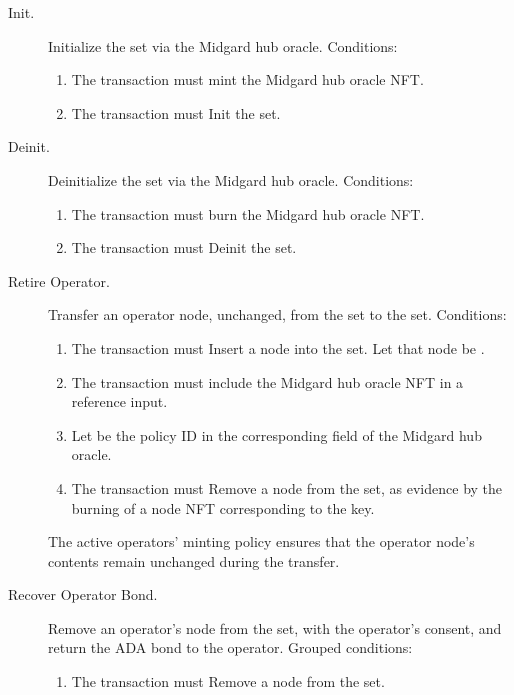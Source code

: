 \documentclass[../midgard.tex]{subfiles}
\begin{document}
\begin{description}
    \item[Init.] Initialize the  set via the Midgard hub oracle.
      Conditions:
        \begin{enumerate}
            \item The transaction must mint the Midgard hub oracle NFT.
            \item The transaction must Init the  set.
        \end{enumerate}
    \item[Deinit.] Deinitialize the  set via the Midgard hub oracle.
      Conditions:
        \begin{enumerate}
            \item The transaction must burn the Midgard hub oracle NFT.
            \item The transaction must Deinit the  set.
        \end{enumerate}
    \item[Retire Operator.] Transfer an operator node, unchanged, from the  set to the  set.
      Conditions:
        \begin{enumerate}
            \item The transaction must Insert a node into the  set.
              Let that node be .
            \item The transaction must include the Midgard hub oracle NFT in a reference input.
            \item Let  be the policy ID in the corresponding field of the Midgard hub oracle.
            \item The transaction must Remove a node from the  set, as evidence by the burning of a  node NFT corresponding to the  key.
        \end{enumerate}
        The active operators' minting policy ensures that the operator node's contents remain unchanged during the transfer.
    \item[Recover Operator Bond.] Remove an operator's node from the  set, with the operator's consent, and return the ADA bond to the operator.
      Grouped conditions:
        \begin{enumerate}
            \item The transaction must Remove a node from the  set.

\end{enumerate}
\end{description}
\end{document}
